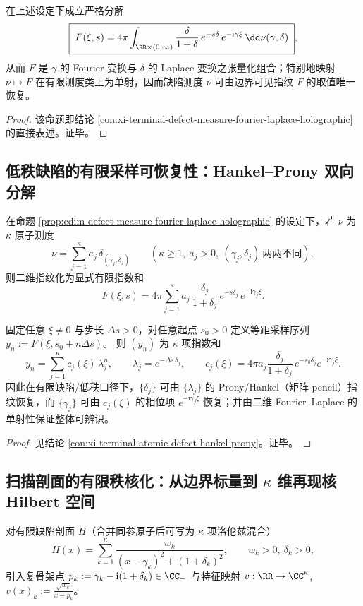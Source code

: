 \begin{proposition}[二维指纹的张量化分解与单射性]\label{prop:cdim-defect-measure-fourier-laplace-holographic}
在上述设定下成立严格分解
\[
\boxed{\;
F(\xi,s)=4\pi\int_{\RR\times(0,\infty)}\frac{\delta}{1+\delta}\,e^{-s\delta}\,e^{-\mathrm{i}\gamma\xi}\,\dd\nu(\gamma,\delta)\; } ,
\]
从而 \(F\) 是 \(\gamma\) 的 Fourier 变换与 \(\delta\) 的 Laplace 变换之张量化组合；特别地映射 \(\nu\mapsto F\) 在有限测度类上为单射，因而缺陷测度 \(\nu\) 可由边界可见指纹 \(F\) 的取值唯一恢复。
\end{proposition}
\begin{proof}
该命题即结论 \ref{con:xi-terminal-defect-measure-fourier-laplace-holographic} 的直接表述。证毕。
\end{proof}

\subsection{低秩缺陷的有限采样可恢复性：Hankel--Prony 双向分解}\label{subsec:cdim-hankel-prony-reconstruction}
在命题 \ref{prop:cdim-defect-measure-fourier-laplace-holographic} 的设定下，若 \(\nu\) 为 \(\kappa\) 原子测度
\[
\nu=\sum_{j=1}^{\kappa}a_j\,\delta_{(\gamma_j,\delta_j)}
\qquad(\kappa\ge 1,\ a_j>0,\ (\gamma_j,\delta_j)\ \text{两两不同}),
\]
则二维指纹化为显式有限指数和
\[
F(\xi,s)=4\pi\sum_{j=1}^{\kappa}a_j\,\frac{\delta_j}{1+\delta_j}\,e^{-s\delta_j}\,e^{-\mathrm{i}\gamma_j\xi}.
\]

\begin{proposition}[有限采样的低秩可逆性与参数分离]\label{prop:cdim-atomic-defect-hankel-prony}
固定任意 \(\xi\neq 0\) 与步长 \(\Delta s>0\)，对任意起点 \(s_0>0\) 定义等距采样序列
\(
y_n:=F(\xi,s_0+n\Delta s)
\)。
则 \((y_n)\) 为 \(\kappa\) 项指数和
\[
y_n=\sum_{j=1}^{\kappa}c_j(\xi)\,\lambda_j^{n},
\qquad
\lambda_j=e^{-\Delta s\,\delta_j},
\qquad
c_j(\xi)=4\pi a_j\frac{\delta_j}{1+\delta_j}\,e^{-s_0\delta_j}e^{-\mathrm{i}\gamma_j\xi}.
\]
因此在有限缺陷/低秩口径下，\(\{\delta_j\}\) 可由 \(\{\lambda_j\}\) 的 Prony/Hankel（矩阵 pencil）指纹恢复，而 \(\{\gamma_j\}\) 可由 \(c_j(\xi)\) 的相位项 \(e^{-\mathrm{i}\gamma_j\xi}\) 恢复；并由二维 Fourier--Laplace 的单射性保证整体可辨识。
\end{proposition}
\begin{proof}
见结论 \ref{con:xi-terminal-atomic-defect-hankel-prony}。证毕。
\end{proof}

\subsection{扫描剖面的有限秩核化：从边界标量到 \texorpdfstring{$\kappa$}{kappa} 维再现核 Hilbert 空间}\label{subsec:cdim-scan-profile-finite-rank-rkhs}
对有限缺陷剖面 \(H\)（合并同参原子后可写为 \(\kappa\) 项洛伦兹混合）
\[
H(x)=\sum_{k=1}^{\kappa}\frac{w_k}{(x-\gamma_k)^2+(1+\delta_k)^2},
\qquad
w_k>0,\ \delta_k>0,
\]
引入复骨架点
\(
p_k:=\gamma_k-\mathrm{i}(1+\delta_k)\in\CC_{-}
\)
与特征映射
\(
v:\RR\to\CC^\kappa
\),
\(
v(x)_k:=\frac{\sqrt{w_k}}{x-p_k}
\)。

